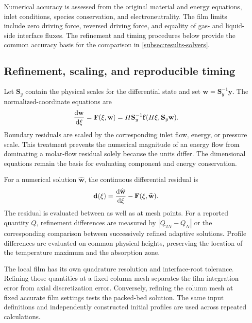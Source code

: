 Numerical accuracy is assessed from the original material and energy equations, inlet conditions, species conservation, and electroneutrality.
The film limits include zero driving force, reversed driving force, and equality of gas- and liquid-side interface fluxes.
The refinement and timing procedures below provide the common accuracy basis for the comparison in \cref{subsec:results-solvers}.

\subsection{Refinement, scaling, and reproducible timing}
Let $\mathbf S_y$ contain the physical scales for the differential state and set $\mathbf w=\mathbf S_y^{-1}\mathbf y$.
The normalized-coordinate equations are
\begin{align}
\odv{\mathbf w}{\xi}=\mathbf F(\xi,\mathbf w)
=H\mathbf S_y^{-1}\mathbf f(H\xi,\mathbf S_y\mathbf w).
\end{align}
Boundary residuals are scaled by the corresponding inlet flow, energy, or pressure scale.
This treatment prevents the numerical magnitude of an energy flow from dominating a molar-flow residual solely because the units differ.
The dimensional equations remain the basis for evaluating component and energy conservation.

For a numerical solution $\widehat{\mathbf w}$, the continuous differential residual is
\begin{align}
\mathbf d(\xi)=\odv{\widehat{\mathbf w}}{\xi}-\mathbf F(\xi,\widehat{\mathbf w}).
\end{align}
The residual is evaluated between as well as at mesh points.
For a reported quantity $Q$, refinement differences are measured by $|Q_{2N}-Q_N|$ or the corresponding comparison between successively refined adaptive solutions.
Profile differences are evaluated on common physical heights, preserving the location of the temperature maximum and the absorption zone.

The local film has its own quadrature resolution and interface-root tolerance.
Refining those quantities at a fixed column mesh separates the film integration error from axial discretization error.
Conversely, refining the column mesh at fixed accurate film settings tests the packed-bed solution.
The same input definitions and independently constructed initial profiles are used across repeated calculations.

